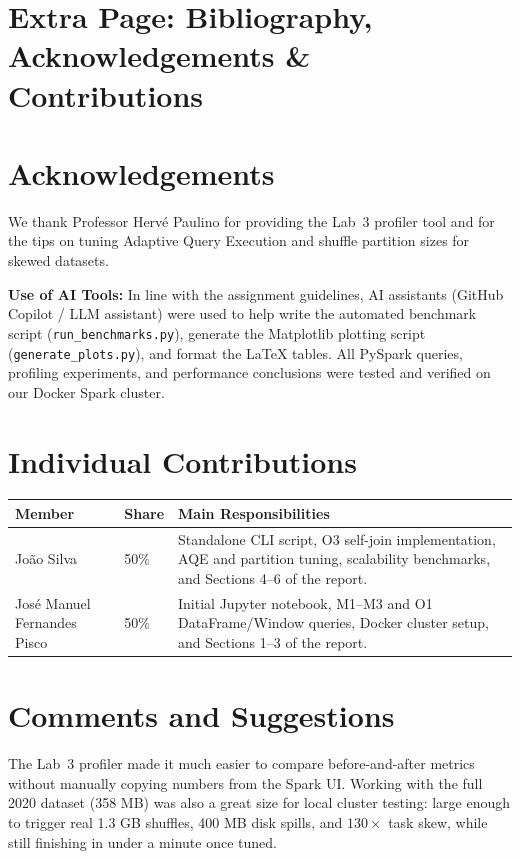 \documentclass[sigconf,nonacm]{acmart}
\begin{document}
\clearpage
\section*{Extra Page: Bibliography, Acknowledgements \& Contributions}




\section*{Acknowledgements}
We thank Professor Herv\'e Paulino for providing the Lab~3 profiler tool and for the tips on tuning Adaptive Query Execution and shuffle partition sizes for skewed datasets.

\textbf{Use of AI Tools:} In line with the assignment guidelines, AI assistants (GitHub Copilot / LLM assistant) were used to help write the automated benchmark script (\texttt{run\_benchmarks.py}), generate the Matplotlib plotting script (\texttt{generate\_plots.py}), and format the LaTeX tables. All PySpark queries, profiling experiments, and performance conclusions were tested and verified on our Docker Spark cluster.

\section*{Individual Contributions}
\begin{table}[h]
\centering
\begin{tabular}{llp{4.0cm}}
\toprule
\textbf{Member} & \textbf{Share} & \textbf{Main Responsibilities} \\
\midrule
Jo\~ao Silva & 50\% & Standalone CLI script, O3 self-join implementation, AQE and partition tuning, scalability benchmarks, and Sections 4--6 of the report. \\
Jos\'e Manuel Fernandes Pisco & 50\% & Initial Jupyter notebook, M1--M3 and O1 DataFrame/Window queries, Docker cluster setup, and Sections 1--3 of the report. \\
\bottomrule
\end{tabular}
\end{table}

\section*{Comments and Suggestions}
The Lab~3 profiler made it much easier to compare before-and-after metrics without manually copying numbers from the Spark UI. Working with the full 2020 dataset (358 MB) was also a great size for local cluster testing: large enough to trigger real 1.3 GB shuffles, 400 MB disk spills, and $130\times$ task skew, while still finishing in under a minute once tuned.
\end{document}
